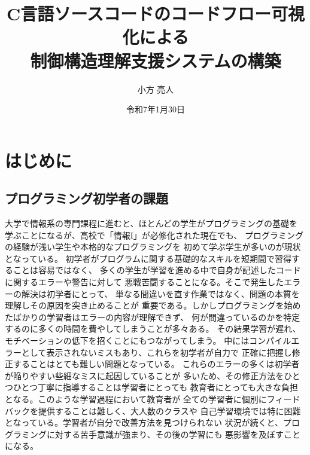 \documentclass{cssspaper}
\title {C言語ソースコードのコードフロー可視化による\\制御構造理解支援システムの構築}
\author{小方 亮人}
\date{令和7年1月30日}
\begin{document}
\maketitle

    \chapter{はじめに}
        \section{プログラミング初学者の課題}
        大学で情報系の専門課程に進むと、ほとんどの学生がプログラミングの基礎を
        学ぶことになるが、高校で「情報I」が必修化された現在でも、
        プログラミングの経験が浅い学生や本格的なプログラミングを
        初めて学ぶ学生が多いのが現状となっている。
        初学者がプログラムに関する基礎的なスキルを短期間で習得することは容易ではなく、
        多くの学生が学習を進める中で自身が記述したコードに関するエラーや警告に対して
        悪戦苦闘することになる。そこで発生したエラーの解決は初学者にとって、
        単なる間違いを直す作業ではなく、問題の本質を理解しその原因を突き止めることが
        重要である。しかしプログラミングを始めたばかりの学習者はエラーの内容が理解できず、
        何が間違っているのかを特定するのに多くの時間を費やしてしまうことが多々ある。
        その結果学習が遅れ、モチベーションの低下を招くことにもつながってしまう。
        中にはコンパイルエラーとして表示されないミスもあり、これらを初学者が自力で
        正確に把握し修正することはとても難しい問題となっている。
        これらのエラーの多くは初学者が陥りやすい些細なミスに起因していることが
        多いため、その修正方法をひとつひとつ丁寧に指導することは学習者にとっても
        教育者にとっても大きな負担となる。このような学習過程において教育者が
        全ての学習者に個別にフィードバックを提供することは難しく、大人数のクラスや
        自己学習環境では特に困難となっている。学習者が自分で改善方法を見つけられない
        状況が続くと、プログラミングに対する苦手意識が強まり、その後の学習にも
        悪影響を及ぼすことになる。
        
\end{document}
